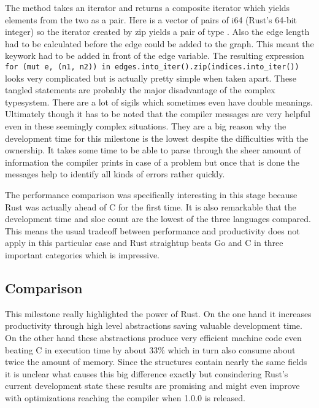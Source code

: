 The  method takes an iterator and returns a composite iterator which yields elements from the two as a pair. Here  is a vector of pairs of i64 (Rust's 64-bit integer) so the iterator created by zip yields a pair of type . Also the edge length had to be calculated before the edge could be added to the graph. This meant the  keywork had to be added in front of the edge variable. The resulting expression \lstinline|for (mut e, (n1, n2)) in edges.into_iter().zip(indices.into_iter())| looks very complicated but is actually pretty simple when taken apart. These tangled statements are probably the major disadvantage of the complex typesystem. There are a lot of sigils which sometimes even have double meanings. Ultimately though it has to be noted that the compiler messages are very helpful even in these seemingly complex situations. They are a big reason why the development time for this milestone is the lowest despite the difficulties with the ownership. It takes some time to be able to parse through the sheer amount of information the compiler prints in case of a problem but once that is done the messages help to identify all kinds of errors rather quickly.

The performance comparison was specifically interesting in this stage because Rust was actually ahead of C for the first time. It is also remarkable that the development time and \gls{sloc} count are the lowest of the three languages compared. This means the usual tradeoff between performance and productivity does not apply in this particular case and Rust straightup beats Go and C in three important categories which is impressive.

\subsection{Comparison}
\label{subsec:Implementation::SequentialBenchmark::Comparison}

This milestone really highlighted the power of Rust. On the one hand it increases productivity through high level abstractions saving valuable development time. On the other hand these abstractions produce very efficient machine code even beating C in execution time by about 33\% which in turn also consume about twice the amount of memory. Since the structures contain nearly the same fields it is unclear what causes this big difference exactly but consindering Rust's current development state these results are promising and might even improve with optimizations reaching the compiler when 1.0.0 is released.

